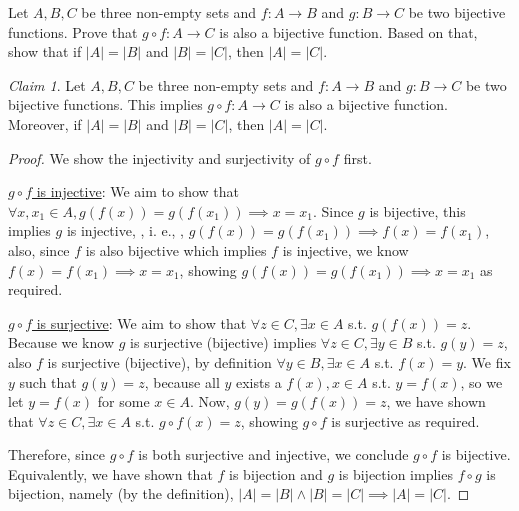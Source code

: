 \documentclass{homework}
\newcommand*{\ie}{\leavevmode\unskip, i. e., \ignorespaces} %
\newcommand{\?}{\stackrel{?}{=}}
\theoremstyle{remark}
\newtheorem*{claim}{Claim}
\begin{document}
\question Let $A,B,C$ be three non-empty sets and $f:A\rightarrow B$ and $g: B\rightarrow C$ be two bijective functions. Prove that $g\circ f:A\rightarrow C$ is also a bijective function. Based on that, show that if $|A|=|B|$ and $|B|=|C|$, then $|A|=|C|$.  
\begin{claim}
    Let $A,B,C$ be three non-empty sets and $f:A\rightarrow B$ and $g: B\rightarrow C$ be two bijective functions. This implies $g\circ f:A\rightarrow C$ is also a bijective function. Moreover, if $|A|=|B|$ and $|B|=|C|$, then $|A|=|C|$.  
\end{claim}
\begin{proof}
    We show the injectivity and surjectivity of $g\circ f$ first. 

    \underline{$g\circ f$ is injective}: We aim to show that $\forall x,x_1\in A, g(f(x))=g(f(x_1))\implies x=x_1$. Since $g$ is bijective, this implies $g$ is injective, \ie, $g(f(x))=g(f(x_1))\implies f(x)=f(x_1)$, also, since $f$ is also bijective which implies $f$ is injective, we know $f(x)=f(x_1)\implies x=x_1$, showing $g(f(x))=g(f(x_1))\implies x=x_1$ as required.

    \underline{$g\circ f$ is surjective}: We aim to show that $\forall z\in C, \exists x\in A$ s.t. $g(f(x))=z$. Because we know $g$ is surjective (bijective) implies $\forall z\in C, \exists y\in B$ s.t. $g(y)=z$, also $f$ is surjective (bijective), by definition $\forall y\in B, \exists x\in A$ s.t. $f(x)=y$. We fix $y$ such that $g(y)=z$, because all $y$ exists a $f(x),x\in A$ s.t. $y=f(x)$, so we let $y=f(x)$ for some $x\in A$. Now, $g(y)=g(f(x))=z$, we have shown that $\forall z\in C, \exists x\in A$ s.t. $g\circ f(x)=z$, showing $g\circ f$ is surjective as required. 

    Therefore, since $g\circ f$ is both surjective and injective, we conclude $g\circ f$ is bijective. Equivalently, we have shown that $f$ is bijection and $g$ is bijection implies $f\circ g$ is bijection, namely (by the definition), $|A|=|B|\land |B|=|C|\implies |A|=|C|$. 
\end{proof}
\end{document}
